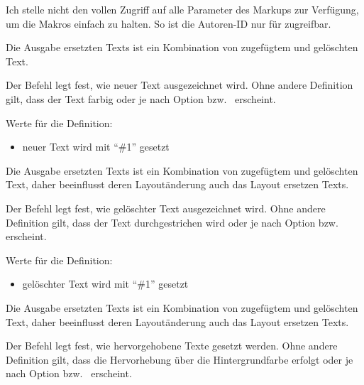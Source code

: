 Ich stelle nicht den vollen Zugriff auf alle Parameter des Markups zur Verfügung, um die Makros einfach zu halten.
So ist \zB die Autoren-ID nur für  zugreifbar.

Die Ausgabe ersetzten Texts ist ein Kombination von zugefügtem und gelöschten Text.




Der Befehl  legt fest, wie neuer Text ausgezeichnet wird.
Ohne andere Definition gilt, dass der Text farbig oder je nach Option  bzw.\  erscheint.

Werte für die Definition:

\begin{itemize}
	\item neuer Text wird mit "`\#1"' gesetzt
\end{itemize}


Die Ausgabe ersetzten Texts ist ein Kombination von zugefügtem und gelöschten Text, daher beeinflusst deren Layoutänderung auch das Layout ersetzen Texts.




Der Befehl  legt fest, wie gelöschter Text ausgezeichnet wird.
Ohne andere Definition gilt, dass der Text durchgestrichen wird oder je nach Option  bzw.\  erscheint.

Werte für die Definition:

\begin{itemize}
	\item gelöschter Text wird mit "`\#1"' gesetzt
\end{itemize}

Die Ausgabe ersetzten Texts ist ein Kombination von zugefügtem und gelöschten Text, daher beeinflusst deren Layoutänderung auch das Layout ersetzen Texts.





Der Befehl  legt fest, wie hervorgehobene Texte gesetzt werden.
Ohne andere Definition gilt, dass die Hervorhebung über die Hintergrundfarbe erfolgt oder je nach Option  bzw.\  erscheint.

